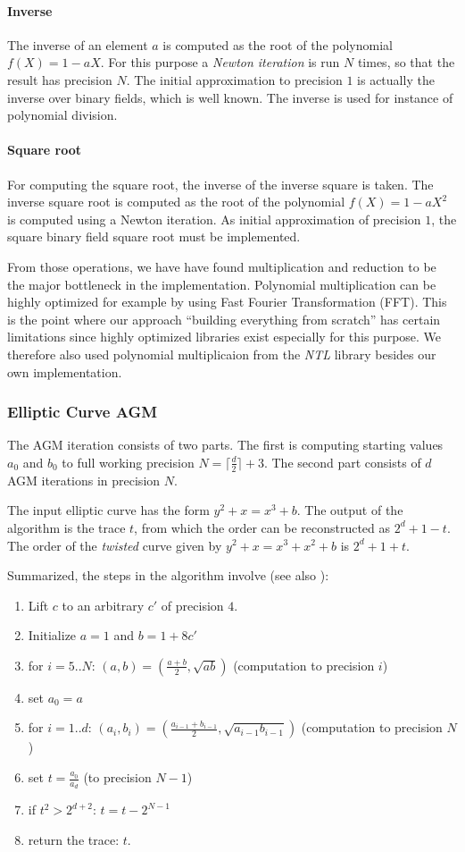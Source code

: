 \documentclass[11pt,english]{article}
\begin{document}
\paragraph{Inverse}
The inverse of an element $a$ is computed as the root of the polynomial $f(X)=1-aX$. For this purpose a \emph{Newton iteration} is run $N$ times, so that the result has precision $N$. The initial approximation to precision $1$ is actually the inverse over binary fields, which is well known. The inverse is used for instance of polynomial division.
\paragraph{Square root}
For computing the square root, the inverse of the inverse square is taken. The inverse square root is computed as the root of the polynomial $f(X)=1-aX^2$ is computed using a Newton iteration. As initial approximation of precision $1$, the square binary field square root must be implemented.

From those operations, we have have found multiplication and reduction to be the major bottleneck in the implementation. Polynomial multiplication can be highly optimized for example by using Fast Fourier Transformation (FFT). This is the point where our approach ``building everything from scratch'' has certain limitations since highly optimized libraries exist especially for this purpose. We therefore also used polynomial multiplicaion from the \emph{NTL} library besides our own implementation.

\subsubsection{Elliptic Curve AGM}
The AGM iteration consists of two parts. The first is computing starting values $a_0$ and $b_0$ to full working precision $N=\lceil\frac{d}{2}\rceil+3$. The second part consists of $d$ AGM iterations in precision $N$.

The input elliptic curve has the form $y^2+x=x^3+b$. The output of the algorithm is the trace $t$, from which the order can be reconstructed as $2^d+1-t$. The order of the \emph{twisted} curve given by $y^2+x=x^3+x^2+b$ is $2^d+1+t$.

Summarized, the steps in the algorithm involve (see also \cite{handbook}):
\begin{enumerate}
 \item Lift $c$ to an arbitrary $c'$ of precision $4$.
 \item Initialize $a=1$ and $b=1+8c'$
 \item for $i=5..N$: $(a,b)=(\frac{a+b}{2},\sqrt{ab})$ (computation to precision $i$)
 \item set $a_0=a$
 \item for $i=1..d$: $(a_i,b_i)=(\frac{a_{i-1}+b_{i-1}}{2},\sqrt{a_{i-1}b_{i-1}})$ (computation to precision $N$)
 \item set $t=\frac{a_0}{a_d}$ (to precision $N-1$)
 \item if $t^2>2^{d+2}$: $t=t-2^{N-1}$
 \item return the trace: $t$.
\end{enumerate}
\end{document}
